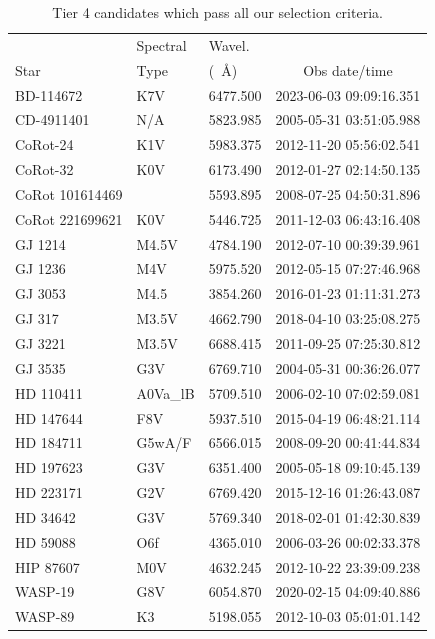 \documentclass[twocolumn]{aastex701}
\begin{document}
\begin{table}
\centering
\begin{tabular}{|l|l|l|c|}
\hline
     & Spectral& Wavel.& \\
Star & Type & (~\AA) & Obs date/time \\
\hline
BD-114672 & K7V & 6477.500 & 2023-06-03 09:09:16.351 \\
CD-4911401 & N/A & 5823.985 & 2005-05-31 03:51:05.988 \\
CoRot-24 & K1V & 5983.375 & 2012-11-20 05:56:02.541 \\
CoRot-32 & K0V & 6173.490 & 2012-01-27 02:14:50.135 \\
CoRot 101614469 &  & 5593.895 & 2008-07-25 04:50:31.896 \\
CoRot 221699621 & K0V & 5446.725 & 2011-12-03 06:43:16.408 \\
GJ 1214 & M4.5V & 4784.190 & 2012-07-10 00:39:39.961 \\
GJ 1236 & M4V & 5975.520 & 2012-05-15 07:27:46.968 \\
GJ 3053 & M4.5 & 3854.260 & 2016-01-23 01:11:31.273 \\
GJ 317 & M3.5V & 4662.790 & 2018-04-10 03:25:08.275 \\
GJ 3221 & M3.5V & 6688.415 & 2011-09-25 07:25:30.812 \\
GJ 3535 & G3V & 6769.710 & 2004-05-31 00:36:26.077 \\
HD 110411 & A0Va\_lB & 5709.510 & 2006-02-10 07:02:59.081 \\
HD 147644 & F8V & 5937.510 & 2015-04-19 06:48:21.114 \\
HD 184711 & G5wA/F & 6566.015 & 2008-09-20 00:41:44.834 \\
HD 197623 & G3V & 6351.400 & 2005-05-18 09:10:45.139 \\
HD 223171 & G2V & 6769.420 & 2015-12-16 01:26:43.087 \\
HD 34642 & G3V & 5769.340 & 2018-02-01 01:42:30.839 \\
HD 59088 & O6f & 4365.010 & 2006-03-26 00:02:33.378 \\
HIP 87607 & M0V & 4632.245 & 2012-10-22 23:39:09.238 \\
WASP-19 & G8V & 6054.870 & 2020-02-15 04:09:40.886 \\
WASP-89 & K3 & 5198.055 & 2012-10-03 05:01:01.142 \\
\hline
\end{tabular}
\caption{Tier 4 candidates which pass all our selection criteria.}
\label{t:corecandidates}
\end{table}
\end{document}
